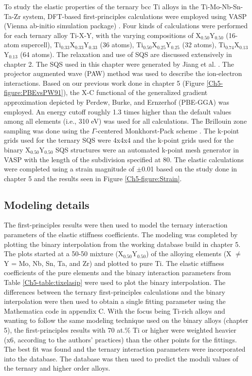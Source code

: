 To study the elastic properties of the ternary bcc Ti alloys in the Ti-Mo-Nb-Sn-Ta-Zr system, DFT-based first-principles calculations were employed using VASP (Vienna ab-initio simulation package) \cite{Kresse1996,Kresse1999}. Four kinds of calculations were performed for each ternary alloy Ti-X-Y, with the varying compositions of X$_{0.50}$Y$_{0.50}$ (16-atom supercell), Ti$_{0.33}$X$_{0.33}$Y$_{0.33}$ (36 atoms), Ti$_{0.50}$X$_{0.25}$Y$_{0.25}$ (32 atoms), Ti$_{0.74}$X$_{0.13}$Y$_{0.13}$ (64 atoms). The relaxation and use of SQS are discussed extensively in chapter 2. The SQS used in this chapter were generated by Jiang et al. \cite{Jiang2004,Jiang2009}. The projector augmented wave (PAW) method was used to describe the ion-electron interactions. Based on our previous work done in chapter 5 (Figure \ref{Ch5-figure:PBEvsPW91}), the X-C functional of the generalized gradient approximation depicted by Perdew, Burke, and Ernzerhof (PBE-GGA) \cite{Perdew1996a} was employed. An energy cutoff roughly 1.3 times higher than the default values among all elements (i.e., 310 eV) was used for all calculations. The Brillouin zone sampling was done using the $\Gamma$-centered Monkhorst-Pack scheme \cite{Monkhorst1976a}. The k-point grids used for the ternary SQS were 4x4x4 and the k-point grids used for the binary X$_{0.50}$Y$_{0.50}$ SQS structures were an automated k-point mesh generator in VASP with the length of the subdivision specified at 80. The elastic calculations were completed using a strain magnitude of $\pm$0.01 based on the study done in chapter 5 and the results seen in Figure \ref{Ch5-figure:Strain}.

\subsection{Modeling details}

The first-principles results were then used to model the ternary interaction parameters of the elastic stiffness coefficients. The modeling was completed by plotting the binary interpolation from the working database build in chapter 5. The plots started at a 50-50 mixture (X$_{0.50}$Y$_{0.50}$) of the alloying elements (X $\neq$ Y = Mo, Nb, Sn, Ta, and Zr) and plotted to pure Ti. The elastic stiffness coefficients of the pure elements and the binary interaction parameters from Table \ref{Ch5-table:tixelasip} were used to plot the binary interpolation. The differences between the ternary first-principles calculations and the binary interpolation were then used to obtain a single fitting parameter using the Mathematica code in appendix C. With the focus being Ti-rich alloys and wanting to follow the same modeling technique used on the binary alloys (chapter 5), the first-principles results with 70 at.\% Ti or higher were weighted heavier (x6, according to the authors' practices) than the other points for the fittings. The best fit was found and the ternary interaction parameters were incorporated into the database. The database was then used to predict the moduli values of the ternary and higher order alloys. 

